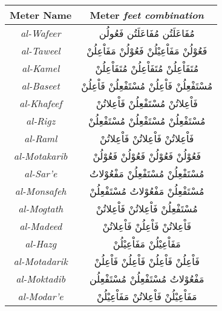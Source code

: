 \documentclass[12pt]{report}
\begin{document}
 


\begin{center}
  \begin{tabular}[h!]{|c|c|} 
    \hline
    \textbf{Meter Name} & \textbf{Meter} \small{\textit{feet combination}} \\ 
    \hline
   \textit{al-Wafeer}    & \textarabic{مُفَاعَلَتُن مُفَاعَلَتُن فَعُولُن} \\ %
   \textit{al-Taweel}    & \textarabic{فَعُوْلُنْ مَفَاْعِيْلُنْ فَعُوْلُنْ مَفَاْعِلُنْ} \\ %
   \textit{al-Kamel}     & \textarabic{مُتَفَاْعِلُنْ مُتَفَاْعِلُنْ مُتَفَاْعِلُنْ} \\%
   \textit{al-Baseet}    & \textarabic{مُسْتَفْعِلُنْ فَاْعِلُنْ مُسْتَفْعِلُنْ فَاْعِلُنْ} \\%
   \textit{al-Khafeef}   & \textarabic{فَاْعِلاتُنْ مُسْتَفْعِلُنْ فَاْعِلاتُنْ} \\ %
   \textit{al-Rigz}      & \textarabic{مُسْتَفْعِلُنْ مُسْتَفْعِلُنْ مُسْتَفْعِلُنْ} \\%
   \textit{al-Raml}      & \textarabic{فَاْعِلاتُنْ فَاْعِلاتُنْ فَاْعِلاتُنْ} \\ %
   \textit{al-Motakarib} & \textarabic{فَعُوْلُنْ فَعُوْلُنْ فَعُوْلُنْ فَعُوْلُنْ} \\%
   \textit{al-Sar'e}     & \textarabic{مُسْتَفْعِلُنْ مُسْتَفْعِلُنْ مَفْعُوْلاتُ} \\%
   \textit{al-Monsafeh}  & \textarabic{مُسْتَفْعِلُنْ مَفْعُوْلاتُ مُسْتَفْعِلُنْ} \\
   \textit{al-Mogtath}   & \textarabic{مُسْتَفْعِلُنْ فَاْعِلاتُنْ فَاْعِلاتُنْ} \\
   \textit{al-Madeed}    & \textarabic{فَاْعِلاتُنْ فَاْعِلُنْ فَاْعِلاتُنْ } \\
   \textit{al-Hazg}      & \textarabic{مَفَاْعِيْلُنْ مَفَاْعِيْلُنْ} \\%
   \textit{al-Motadarik} & \textarabic{فَاْعِلُنْ فَاْعِلُنْ فَاْعِلُنْ فَاْعِلُنْ} \\%
   \textit{al-Moktadib}  & \textarabic{مَفْعُوْلاتُ مُسْتَفْعِلُنْ مُسْتَفْعِلُن} \\
   \textit{al-Modar'e}   & \textarabic{مَفَاْعِيْلُنْ فَاْعِلاتُنْ مَفَاْعِيْلُنْ} \\
    \hline
  \end{tabular}
  \label{arud:meters}
\end{center}
\end{document}
